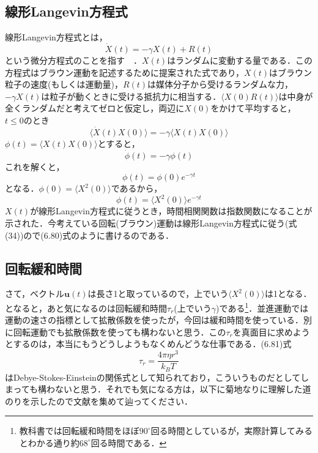 \documentclass{jsarticle}
\begin{document}
\subsection{線形Langevin方程式}
線形Langevin方程式とは，
\begin{equation}
\dot{X}(t)=-\gamma X(t)+R(t)
\end{equation}
という微分方程式のことを指す~\cite{藤坂}~\cite{吉森}．$X(t)$はランダムに変動する量である．この方程式はブラウン運動を記述するために提案された式であり，$X(t)$はブラウン粒子の速度(もしくは運動量)，$R(t)$は媒体分子から受けるランダムな力，$-\gamma X(t)$は粒子が動くときに受ける抵抗力に相当する．$\langle X(0)R(t) \rangle$は中身が全くランダムだと考えてゼロと仮定し，両辺に$X(0)$をかけて平均すると，$t\le 0$のとき
\begin{equation}
\langle \dot{X}(t)X(0) \rangle=-\gamma \langle X(t)X(0) \rangle
\end{equation}
$\phi (t)=\langle X(t)X(0) \rangle$とすると，
\begin{equation}
\dot{\phi}(t)=-\gamma \phi(t)
\end{equation}
これを解くと，
\begin{equation}
\phi (t)=\phi(0)e^{-\gamma t}
\end{equation}
となる．$\phi(0)=\langle X^2 (0)\rangle$であるから，
\begin{equation}
\phi (t)=\langle X^2 (0)\rangle e^{-\gamma t}
\end{equation}
$X(t)$が線形Langevin方程式に従うとき，時間相関関数は指数関数になることが示された．今考えている回転(ブラウン)運動は線形Langevin方程式に従う(式(34))ので(6.80)式のように書けるのである．

\subsection{回転緩和時間}
さて，ベクトル$\bm{u}(t)$は長さ1と取っているので，上でいう$\langle X^2 (0)\rangle$は1となる．となると，あと気になるのは回転緩和時間$\tau _r$(上でいう$\gamma$)である\footnote{教科書では回転緩和時間をほぼ$90^\circ$回る時間としているが，実際計算してみるとわかる通り約$68^\circ$回る時間である．}．並進運動では運動の速さの指標として拡散係数を使ったが，今回は緩和時間を使っている．別に回転運動でも拡散係数を使っても構わないと思う．この$\tau _r$を真面目に求めようとするのは，本当にもうどうしようもなくめんどうな仕事である．(6.81)式
\begin{equation}
\tau _r =\frac{4\pi \eta r^3}{k_B T}
\end{equation}
はDebye-Stokes-Einsteinの関係式として知られており，こういうものだとしてしまっても構わないと思う．それでも気になる方は，以下に菊地なりに理解した道のりを示したので文献を集めて辿ってください．
\end{document}
